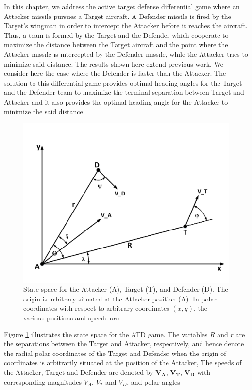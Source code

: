 In this chapter, we address the active target defense differential game where an Attacker missile pursues a Target aircraft. A Defender missile is fired by the Target’s wingman in order to intercept the Attacker before it reaches the aircraft. Thus, a team is formed by the Target and the Defender which
cooperate to maximize the distance between the Target aircraft and the point where the Attacker missile is intercepted by the Defender missile, while the Attacker tries to minimize said distance. The results shown here extend previous work. We consider here the case where the Defender is faster than
the Attacker. The solution to this differential game provides optimal heading angles for the Target and the Defender team to maximize the terminal separation between Target and Attacker and it also provides the optimal heading angle for the Attacker to minimize the said distance.

\begin{figure}[H]
	\centering
	\includegraphics[width=1.0\textwidth]{fig/fig7-1.pdf}
	\caption{State space for the Attacker (A), Target (T), and Defender (D). The origin is arbitrary situated at the Attacker position (A). In polar coordinates with respect to arbitrary coordinates $(x,y)$, the various positions and speeds are}
	\label{7.1}
\end{figure}

Figure \ref{7.1} illustrates the state space for the ATD game. The variables $R$ and $r$ are the separations between the Target and Attacker, respectively, and hence denote the radial polar coordinates of the Target and Defender when the origin of coordinates is arbitrarily situated at the position of the Attacker, The speeds of the Attacker, Target and Defender are denoted by $\boldsymbol{V_A}$, $\boldsymbol{V_T}$, $\boldsymbol{V_D}$ with corresponding magnitudes $V_A$, $V_T$ and $V_D$, and polar angles 

